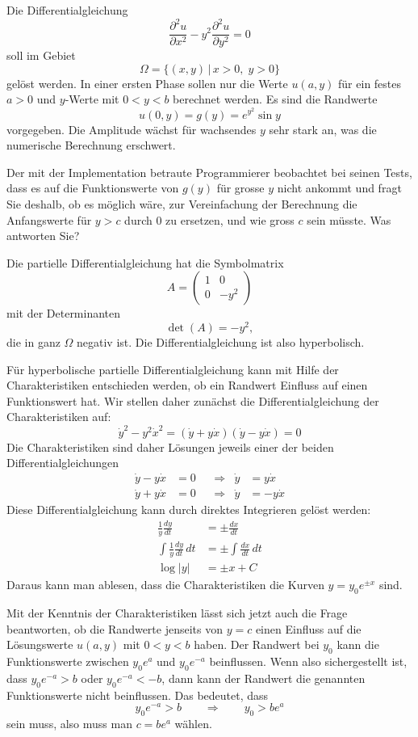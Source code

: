 Die Differentialgleichung
\[
\frac{\partial^2 u}{\partial x^2}-y^2\frac{\partial^2u}{\partial y^2}=0
\]
soll im Gebiet
\[
\Omega=\{(x,y)\,|\,x>0,\;y>0\}
\]
gelöst werden.
In einer ersten Phase sollen nur die Werte $u(a,y)$ für ein festes 
$a > 0$ und $y$-Werte mit $0<y<b$ berechnet werden.
Es sind die Randwerte
\[
u(0,y)=g(y)=e^{y^2}\sin y
\]
vorgegeben. Die Amplitude wächst für wachsendes $y$ sehr stark an,
was die numerische Berechnung erschwert.

Der mit der Implementation betraute Programmierer beobachtet bei seinen
Tests, dass es auf die Funktionswerte von $g(y)$ für grosse
$y$ nicht ankommt und fragt Sie deshalb, ob es möglich wäre, zur
Vereinfachung der Berechnung die Anfangswerte für $y>c$ durch
$0$ zu ersetzen, und wie gross $c$ sein müsste. Was antworten Sie?

\begin{loesung}
Die partielle Differentialgleichung hat die Symbolmatrix
\[
A=
\begin{pmatrix}
1&0\\0&-y^2
\end{pmatrix}
\]
mit der Determinanten
\[
\det(A)=-y^2,
\]
die in ganz $\Omega$ negativ ist.
Die Differentialgleichung ist also hyperbolisch.

Für hyperbolische partielle Differentialgleichung kann mit Hilfe der
Charakteristiken entschieden werden, ob ein Randwert Einfluss auf einen
Funktionswert hat. Wir stellen daher zunächst die Differentialgleichung
der Charakteristiken auf:
\[
\dot y^2-y^2\dot x^2=(\dot y+y\dot x)(\dot y-y\dot x)=0
\]
Die Charakteristiken sind daher Lösungen jeweils einer der beiden
Differentialgleichungen
\begin{align*}
\dot y-y\dot x&=0&&\Rightarrow&\dot y&=y\dot x\\
\dot y+y\dot x&=0&&\Rightarrow&\dot y&=-y\dot x
\end{align*}
Diese Differentialgleichung kann durch direktes Integrieren
gelöst werden:
\begin{align*}
\frac1y\frac{dy}{dt}&=\pm\frac{dx}{dt}\\
\int \frac1y\frac{dy}{dt}\,dt&=\pm\int \frac{dx}{dt}\,dt\\
\log |y|&= \pm x + C
\end{align*}
Daraus kann man ablesen, dass die Charakteristiken die Kurven 
$y=y_0e^{\pm x}$ sind.

Mit der Kenntnis der Charakteristiken lässt sich jetzt auch die 
Frage beantworten, ob die Randwerte jenseits von $y=c$ einen Einfluss
auf die Lösungswerte $u(a,y)$ mit $0<y<b$ haben. Der Randwert
bei $y_0$ kann die Funktionswerte zwischen $y_0e^a$ und $y_0e^{-a}$
beinflussen. Wenn also sichergestellt ist, dass $y_0e^{-a} > b$
oder $y_0e^{-a} < -b$, dann kann der Randwert die genannten Funktionswerte
nicht beinflussen. Das bedeutet, dass 
\[
y_0e^{-a}>b
\qquad\Rightarrow\qquad
y_0>be^a
\]
sein muss, also muss man $c=be^a$ wählen.
\end{loesung}

